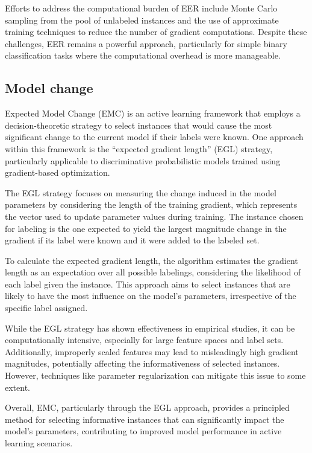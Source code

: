 \documentclass[11pt]{article}
\begin{document}
Efforts to address the computational burden of EER include Monte Carlo sampling from the pool of unlabeled instances and the use of approximate training techniques to reduce the number of gradient computations. Despite these challenges, EER remains a powerful approach, particularly for simple binary classification tasks where the computational overhead is more manageable.

\subsection{Model change}
Expected Model Change (EMC) is an active learning framework that employs a decision-theoretic strategy to select instances that would cause the most significant change to the current model if their labels were known. One approach within this framework is the ``expected gradient length'' (EGL) strategy, particularly applicable to discriminative probabilistic models trained using gradient-based optimization\cite{settles_multiple-instance_2007}.

The EGL strategy focuses on measuring the change induced in the model parameters by considering the length of the training gradient, which represents the vector used to update parameter values during training. The instance chosen for labeling is the one expected to yield the largest magnitude change in the gradient if its label were known and it were added to the labeled set\cite{cai_active_2014}.

To calculate the expected gradient length, the algorithm estimates the gradient length as an expectation over all possible labelings, considering the likelihood of each label given the instance. This approach aims to select instances that are likely to have the most influence on the model's parameters, irrespective of the specific label assigned.

While the EGL strategy has shown effectiveness in empirical studies, it can be computationally intensive, especially for large feature spaces and label sets. Additionally, improperly scaled features may lead to misleadingly high gradient magnitudes, potentially affecting the informativeness of selected instances. However, techniques like parameter regularization can mitigate this issue to some extent.

Overall, EMC, particularly through the EGL approach, provides a principled method for selecting informative instances that can significantly impact the model's parameters, contributing to improved model performance in active learning scenarios.
\end{document}
